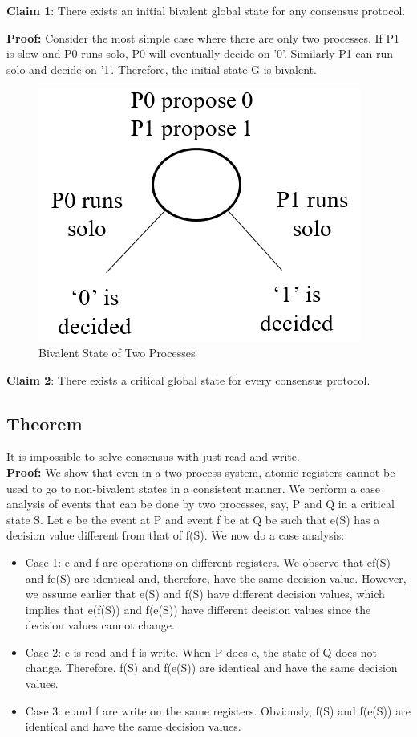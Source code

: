 \documentclass[twoside]{article}
\begin{document}
\textbf{Claim 1}: There exists an initial bivalent global state for any consensus protocol.

\textbf{Proof:}
Consider the most simple case where there are only two processes. If P1 is slow and P0 runs solo, P0 will eventually decide on '0'. Similarly P1 can run solo and decide on '1'. Therefore, the initial state G is bivalent.

\begin{figure}[H]
    \centering
    \includegraphics[scale=0.75]{firstclaim.png}
    \caption{Bivalent State of Two Processes}
    \label{fig:6}
\end{figure}

\textbf{Claim 2}: There exists a critical global state for every consensus protocol.

\subsection{Theorem}
It is impossible to solve consensus with just read and write.\\
\textbf{Proof:} We show that even in a two-process system, atomic registers cannot be used to go to non-bivalent states in a consistent manner. We perform a case analysis of events that can be done by two processes, say, P and Q in a critical state S. Let e be the event at P and event f be at Q be such that e(S) has a decision value diﬀerent from that of f(S). 
We now do a case analysis:
\begin{itemize}
    \item Case 1: e and f are operations on different registers. We observe that ef(S) and fe(S) are identical and,  therefore, have the same decision value. However, we assume earlier that e(S) and f(S) have different decision values, which implies that e(f(S)) and f(e(S)) have different decision values since the decision values cannot change.
    \item Case 2: e is read and f is write. When P does e, the state of Q does not change. Therefore, f(S) and f(e(S)) are identical and have the same decision values.
    \item Case 3: e and f are write on the same registers. Obviously, f(S) and f(e(S)) are identical and have the same decision values.
\end{itemize}
\end{document}
